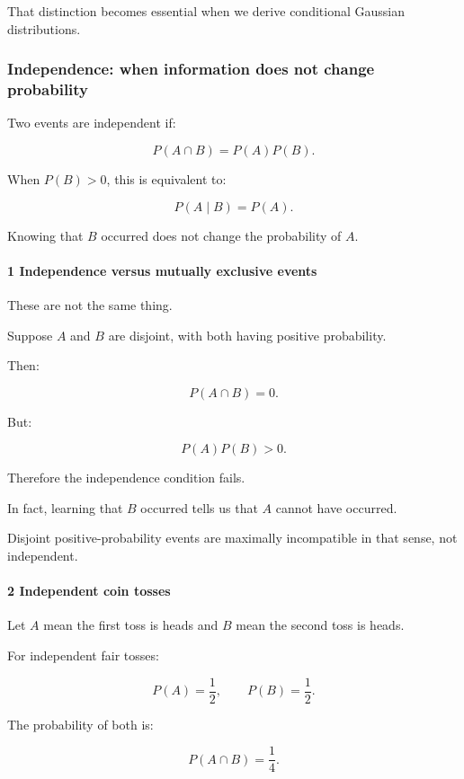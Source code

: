 That distinction becomes essential when we derive conditional Gaussian distributions.

\subsubsection{Independence: when information does not change probability}\label{independence-when-information-does-not-change-probability}

Two events are independent if:

\[
 \boxed{ P(A\cap B)=P(A)P(B) }.
\]

When \(P(B)>0\), this is equivalent to:

\[
 P(A\mid B)=P(A).
\]

Knowing that \(B\) occurred does not change the probability of \(A\).

\paragraph{1 Independence versus mutually exclusive events}\label{independence-versus-mutually-exclusive-events}

These are not the same thing.

Suppose \(A\) and \(B\) are disjoint, with both having positive probability.

Then:

\[
 P(A\cap B)=0.
\]

But:

\[
 P(A)P(B)>0.
\]

Therefore the independence condition fails.

In fact, learning that \(B\) occurred tells us that \(A\) cannot have occurred.

Disjoint positive-probability events are maximally incompatible in that sense, not independent.

\paragraph{2 Independent coin tosses}\label{independent-coin-tosses}

Let \(A\) mean the first toss is heads and \(B\) mean the second toss is heads.

For independent fair tosses:

\[
 P(A)=\frac12, \qquad P(B)=\frac12.
\]

The probability of both is:

\[
 P(A\cap B)=\frac14.
\]

